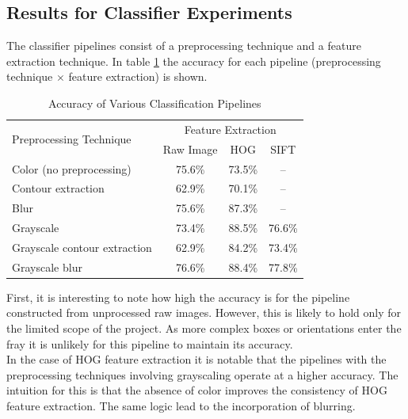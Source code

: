 \documentclass[letterpaper, 10 pt, conference]{conf/ieeeconf}  %
\begin{document}
\subsection{Results for Classifier Experiments}
The classifier pipelines consist of a preprocessing technique and a feature
extraction technique. In table \ref{tab:classification} the accuracy for each
pipeline (preprocessing technique $\times$ feature extraction) is shown.
\begin{table}[h]
  \centering
  \begin{tabular}{l c c c}
    \toprule
    \multirow{2}{*}[-0.5\dimexpr \aboverulesep + \belowrulesep + \cmidrulewidth]{Preprocessing Technique} & \multicolumn{3}{c}{Feature Extraction}\\
    \cmidrule(lr){2-4}
                            & Raw Image & HOG & SIFT \\
    \midrule
    Color (no preprocessing)     & 75.6\% & 73.5\%                    & -- \\
    Contour extraction           & 62.9\% & 70.1\%                    & -- \\
    Blur                         & 75.6\% & 87.3\%                    & -- \\
    Grayscale                    & 73.4\% & \cellcolor{blue!25}88.5\% & 76.6\% \\
    Grayscale contour extraction & 62.9\% & 84.2\%                    & 73.4\% \\
    Grayscale blur               & 76.6\% & 88.4\%                    & 77.8\% \\
    \bottomrule
  \end{tabular}
  \caption{Accuracy of Various Classification Pipelines}
  \label{tab:classification}
\end{table}

First, it is interesting to note how high the accuracy is for the pipeline
constructed from unprocessed raw images. However, this is likely to hold only
for the limited scope of the project. As more complex boxes or orientations
enter the fray it is unlikely for this pipeline to maintain its accuracy.\\

In the case of HOG feature extraction it is notable that the pipelines with the
preprocessing techniques involving grayscaling operate at a higher accuracy. The
intuition for this is that the absence of color improves the consistency of HOG
feature extraction. The same logic lead to the incorporation of blurring.\\
\end{document}
